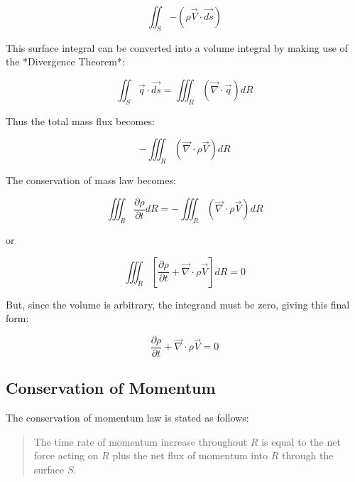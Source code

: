 \begin{equation}
\iint_S{ - (\rho \overrightarrow{V}\cdot\overrightarrow{ds})}
\end{equation}

This surface integral can be converted into a volume integral by making use of
the *Divergence Theorem*:

\begin{equation}
\iint_S \overrightarrow{q}\cdot\overrightarrow{ds} = \iiint_R \left( \overrightarrow{\nabla} \cdot \overrightarrow{q}\right) dR
\end{equation}

Thus the total mass flux becomes:

\begin{equation}
-\iiint_R \left( \overrightarrow{\nabla}\cdot\rho\overrightarrow{V}\right) dR
\end{equation}

The conservation of mass law becomes:
    
\begin{equation}
\iiint_R \frac{\partial\rho}{\partial t} dR = -\iiint_R ( \overrightarrow{\nabla}\cdot\rho\overrightarrow{V}) dR
\end{equation}

or

\begin{equation}
\iiint_R \left[\frac{\partial\rho}{\partial t} + \overrightarrow{\nabla}\cdot\rho\overrightarrow{V}\right] dR = 0
\end{equation}

But, since the volume is arbitrary, the integrand must be zero, giving this final form:

\begin{equation}
\frac{\partial\rho}{\partial t} + \overrightarrow{\nabla}\cdot\rho\overrightarrow{V} = 0
\end{equation}

\subsection{Conservation of Momentum}

The conservation of momentum law is stated as follows:

\begin{quote}
The time rate of momentum increase throughout $R$ is equal to the net force
acting on $R$ plus the net flux of momentum into $R$ through the surface $S$.
\end{quote}


